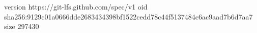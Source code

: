 version https://git-lfs.github.com/spec/v1
oid sha256:9129c01a0666dde2683434398bf1522cedd78c44f5137484c6ac9aad7b6d7aa7
size 297430
